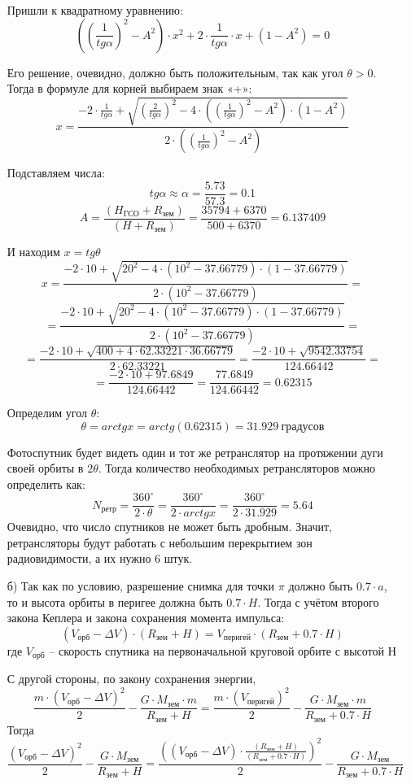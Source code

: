 \begin{enumerate}
    Пришли к квадратному уравнению:
    $$\left(\left(\frac{1}{tg\alpha}\right)^2-A^2\right)\cdot x^2+2\cdot  \frac{1}{tg\alpha} \cdot x+(1-A^2 )=0$$
    
    Его решение, очевидно, должно быть положительным, так как угол $\theta>0$. Тогда в формуле для корней выбираем знак «+»:
    $$x=\frac{-2\cdot  \frac{1}{tg\alpha}+\sqrt{\left(\frac{2}{tg\alpha}\right)^2-4\cdot \left(\left(\frac{1}{tg\alpha}\right)^2-A^2 \right)\cdot (1-A^2)}}{2\cdot \left(\left(\frac{1}{tg\alpha}\right)^2-A^2\right)}$$ 

    Подставляем числа:
    $$tg\alpha \approx \alpha=\frac{5.73}{57.3}=0.1$$
    $$A=\frac{(H_\text{ГСО}+R_\text{зем} )}{(H+R_\text{зем} )}=\frac{35794+6370}{500+6370}=6.137409$$
    
    И находим $x= tg\theta$
    $$x=\frac{-2\cdot 10+\sqrt{20^2-4\cdot (10^2-37.66779)\cdot (1-37.66779)}}{2\cdot (10^2-37.66779)}=$$
    $$=\frac{-2\cdot 10+\sqrt{20^2-4\cdot (10^2-37.66779)\cdot (1-37.66779)}}{2\cdot (10^2-37.66779)}=$$
    $$=\frac{-2\cdot 10+\sqrt{400+4\cdot 62.33221\cdot 36.66779}}{2\cdot 62.33221}=\frac{-2\cdot 10+\sqrt{9542.33754}}{124.66442}=$$
    $$=\frac{-2\cdot 10+97.6849}{124.66442}=\frac{77.6849}{124.66442}=0.62315$$
    
    Определим угол $\theta$:
    $$\theta=arctg x=arctg (0.62315)=31.929 \: \text{градусов}$$
    
    Фотоспутник будет видеть один и тот же ретранслятор на протяжении дуги своей орбиты в $2\theta$. Тогда количество необходимых ретрансляторов можно определить как:
    $$N_\text{ретр}=\frac{360^\circ}{2\cdot \theta}=\frac{360^\circ}{2\cdot arctg x}=\frac{360^\circ}{2\cdot 31.929 }=5.64 $$
    Очевидно, что число спутников не может быть дробным. Значит, ретрансляторы будут работать с небольшим перекрытием зон радиовидимости, а их нужно 6 штук.
    
    \item[б)] Так как по условию, разрешение снимка для точки $\pi$ должно быть $0.7\cdot a$, 
    то и высота орбиты в перигее должна быть $0.7\cdot H$. Тогда с учётом  второго закона Кеплера и закона сохранения момента импульса:
    $$(V_\text{орб}-\Delta V)\cdot (R_\text{зем}+H)=V_\text{перигей}\cdot (R_\text{зем}+0.7 \cdot H)$$
    где $V_\text{орб}$ – скорость спутника на первоначальной круговой орбите с высотой $Н$
    
    С другой стороны, по закону сохранения энергии, 
    $$\frac{m \cdot (V_\text{орб}-\Delta V)^2}{2}-\frac{G \cdot M_\text{зем} \cdot m}{R_\text{зем}+H}=\frac{m \cdot (V_\text{перигей} )^2}{2}-\frac{G \cdot M_\text{зем}\cdot m}{R_\text{зем}+0.7\cdot H}$$
    Тогда
    $$\frac{(V_\text{орб}-\Delta V)^2}{2}-\frac{G \cdot M_\text{зем}}{R_\text{зем}+H}=\frac{\left((V_\text{орб}-\Delta V)\cdot \frac{(R_\text{зем}+H)}{(R_\text{зем}+0.7\cdot H)} \right)^2}{2}-\frac{G \cdot M_\text{зем}}{R_\text{зем}+0.7 \cdot H}$$
    

\end{enumerate}
